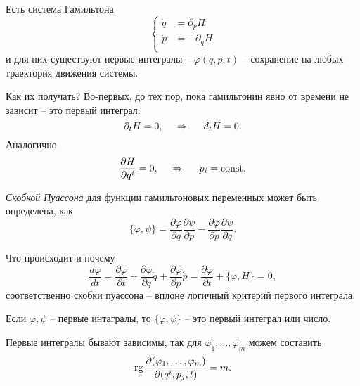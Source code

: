 Есть система Гамильтона
\begin{equation*}
    \left\{\begin{aligned}
        \dot{q} &= \partial_p H \\
        \dot{p} &= - \partial_q H \\
    \end{aligned}\right.
\end{equation*}
и для них существуют первые интегралы -- $\varphi(q, p, t)$ -- сохранение на любых траектория движения системы.

Как их получать? Во-первых, до тех пор, пока гамильтонин явно от времени не зависит -- это первый интеграл:
\begin{equation*}
    \partial_t H = 0, \hspace{0.5cm} \Rightarrow \hspace{0.5cm} d_t H = 0.
\end{equation*}
Аналогично
\begin{equation*}
    \frac{\partial H}{\partial q^i} = 0,
    \hspace{0.5cm} \Rightarrow \hspace{0.5cm}
    p_i = \text{const}.
\end{equation*}

\begin{to_def}
    \textit{Скобкой Пуассона} для функции гамильтоновых переменных может быть определена, как
    \begin{equation*}
        \{\varphi, \psi\} = \frac{\partial \varphi}{\partial q} \frac{\partial \psi}{\partial p} -
        \frac{\partial \varphi}{\partial p} \frac{\partial \psi}{\partial q}.
    \end{equation*}
\end{to_def}

Что происходит и почему
\begin{equation*}
    \frac{d \varphi}{d t} = \frac{\partial \varphi}{\partial t} + \frac{\partial \varphi}{\partial q} \dot{q} + \frac{\partial \varphi}{\partial p} \dot{p} = \frac{\partial \varphi}{\partial t} + \{\varphi, H\} = 0,
\end{equation*}
соответственно скобки пуассона -- вплоне логичный критерий первого интеграла.

\begin{to_thr}[]
    Если $\varphi, \psi$ -- первые интагралы, то $\{\varphi, \psi\}$ -- это первый интеграл или число.
\end{to_thr}

Первые интегралы бывают зависимы, так для $\varphi_1, \ldots, \varphi_m$ можем составить
\begin{equation*}
    \mathop{\mathrm{rg}}\nolimits \frac{\partial (\varphi_1, \ldots, \varphi_m)}{ \partial(q^i, p_j, t)} = m.
\end{equation*}


